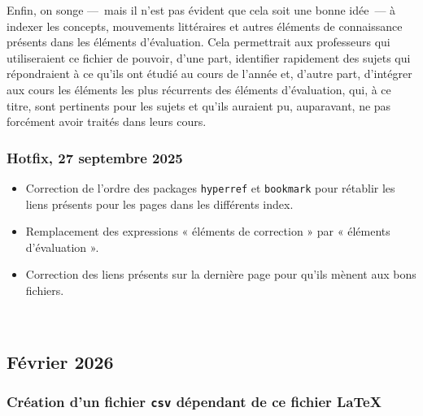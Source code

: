 Enfin, on songe ---~mais il n'est pas évident que cela soit une bonne idée~--- à indexer les concepts, mouvements littéraires et autres éléments de connaissance présents dans les éléments d'évaluation. Cela permettrait aux professeurs qui utiliseraient ce fichier de pouvoir, d'une part, identifier rapidement des sujets qui répondraient à ce qu'ils ont étudié au cours de l'année et, d'autre part, d'intégrer aux cours les éléments les plus récurrents des éléments d'évaluation, qui, à ce titre, sont pertinents pour les sujets et qu'ils auraient pu, auparavant, ne pas forcément avoir traités dans leurs cours.

\subsubsection{Hotfix, 27 septembre 2025}

\begin{itemize}
\item Correction de l'ordre des packages \texttt{hyperref} et \texttt{bookmark} pour rétablir les liens présents pour les pages dans les différents index.

\item Remplacement des expressions « éléments de correction »{} par « éléments d'évaluation »{}. 

\item Correction des liens présents sur la dernière page pour qu'ils mènent aux bons fichiers.
\end{itemize}

\vfill{~}

\subsection{Février 2026}

\subsubsection{Création d'un fichier \texttt{csv} dépendant de ce fichier \LaTeX{}}

